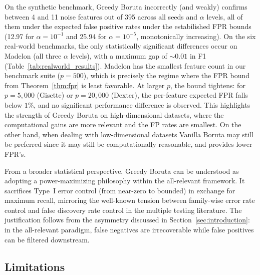 \documentclass[runningheads]{llncs}
\begin{document}
On the synthetic benchmark, Greedy Boruta incorrectly (and weakly) confirms between 4 and 11 noise features out of 395 across all seeds and $\alpha$ levels, all of them under the expected false positive rates under the estabilished FPR bounds (12.97 for $\alpha=10^{-1}$ and 25.94 for $\alpha=10^{-5}$, monotonically increasing).
On the six real-world benchmarks, the only statistically significant differences occur on Madelon (all three $\alpha$ levels), with a maximum gap of ${\sim}0.01$ in F1 (Table~\ref{tab:realworld_results}). Madelon has the smallest feature count in our benchmark suite ($p = 500$), which is precisely the regime where the FPR bound from Theorem~\ref{thm:fpr} is least favorable. At larger $p$, the bound tightens: for $p = 5{,}000$ (Gisette) or $p = 20{,}000$ (Dexter), the per-feature expected FPR falls below $1\%$, and no significant performance difference is observed. This highlights the strength of Greedy Boruta on high-dimensional datasets, where the computational gains are more relevant and the FP rates are smallest. On the other hand, when dealing with low-dimensional datasets Vanilla Boruta may still be preferred since it may still be computationally reasonable, and provides lower FPR's. 

From a broader statistical perspective, Greedy Boruta can be understood as adopting a power-maximizing philosophy within the all-relevant framework. It sacrifices Type~I error control (from near-zero to bounded) in exchange for maximum recall, mirroring the well-known tension between family-wise error rate control and false discovery rate control in the multiple testing literature. The justification follows from the asymmetry discussed in Section~\ref{sec:introduction}: in the all-relevant paradigm, false negatives are irrecoverable while false positives can be filtered downstream.

\subsection{Limitations}
\label{sec:discussion:limitations}
\end{document}
